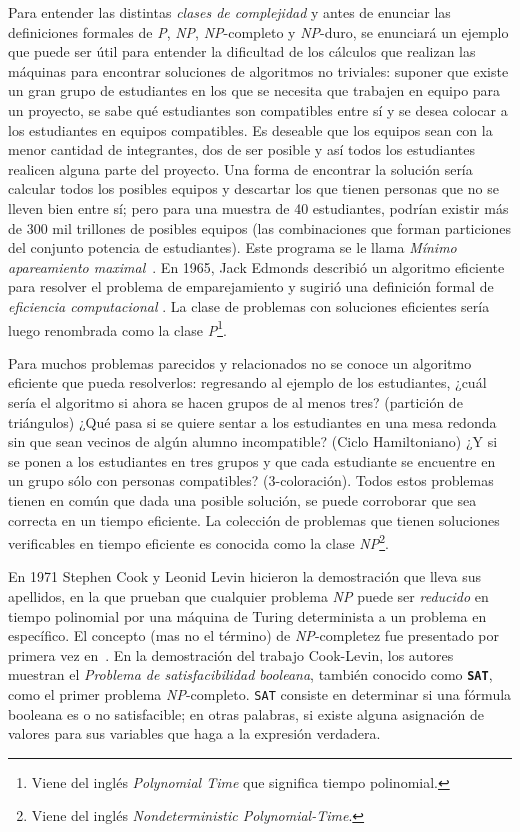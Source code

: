 Para entender las distintas \textit{clases de complejidad} y antes de enunciar
las definiciones formales de \textsl{P}, \textsl{NP}, \textsl{NP}-completo y
\textsl{NP}-duro, se enunciará un ejemplo que puede ser útil para entender la
dificultad de los cálculos que realizan las máquinas para encontrar soluciones
de algoritmos no triviales: suponer que existe un gran grupo de estudiantes
en los que se necesita que trabajen en equipo para un proyecto, se sabe qué
estudiantes son compatibles entre sí y se desea colocar a los estudiantes en
equipos compatibles. Es deseable que los equipos sean con la menor cantidad de
integrantes, dos de ser posible y así todos los estudiantes realicen alguna
parte del proyecto. Una forma de encontrar la solución sería calcular todos los
posibles equipos y descartar los que tienen personas que no se lleven 
bien entre sí; pero para una muestra de 40 estudiantes, podrían existir más de
300 mil trillones de posibles equipos (las combinaciones que forman particiones
del conjunto potencia de estudiantes). Este programa se le llama \textit{Mínimo
  apareamiento maximal}~\cite{10.1007/978-3-540-79228-4_32}.  En 1965, Jack
Edmonds describió un algoritmo eficiente para resolver el problema de
emparejamiento y sugirió una definición formal de \textit{eficiencia
  computacional} \cite{Mathematics}. La clase de problemas con soluciones
eficientes sería luego renombrada como la clase \textsl{P}\footnote{Viene del
  inglés \textit{Polynomial Time} que significa tiempo polinomial.}.

Para muchos problemas parecidos y relacionados no se conoce un algoritmo
eficiente que pueda resolverlos: regresando al ejemplo de los estudiantes, ¿cuál
sería el algoritmo si ahora se hacen grupos de al menos tres? (partición de triángulos)
¿Qué pasa si se quiere sentar a los estudiantes en una mesa redonda sin que sean
vecinos de algún alumno incompatible? (Ciclo Hamiltoniano) ¿Y si se ponen a los
estudiantes en tres grupos y que cada estudiante se encuentre en un grupo sólo
con personas compatibles? (3-coloración).  Todos estos problemas tienen en común
que dada una posible solución, se puede corroborar que sea correcta en un tiempo
eficiente.  La colección de problemas que tienen soluciones verificables en
tiempo eficiente es conocida como la clase \textsl{NP}\footnote{Viene del inglés
  \textit{ Nondeterministic Polynomial-Time}.}.

En 1971 Stephen Cook y Leonid Levin hicieron la demostración que lleva sus
apellidos, en la que prueban que cualquier problema \textsl{NP} puede
ser \textit{reducido} en tiempo polinomial por una máquina de Turing
determinista a un problema en específico. El concepto
(mas no el término) de \textsl{NP}-completez fue presentado por primera
vez en~\cite{Cook}.
En la demostración del trabajo Cook-Levin, los autores muestran el
\textit{Problema de satisfacibilidad booleana}, también conocido como
\texttt{\textbf{SAT}}, como el primer problema \textsl{NP}-completo.
\texttt{SAT} consiste en determinar si una fórmula booleana es o
no satisfacible; en otras palabras, si existe
alguna asignación de valores para sus variables que haga a la expresión
verdadera.

